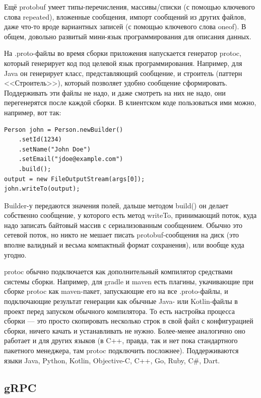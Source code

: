 \documentclass[a5paper]{article}
\begin{document}
Ещё protobuf умеет типы-перечисления, массивы/списки (с помощью ключевого слова repeated), вложенные сообщения, импорт сообщений из других файлов, даже что-то вроде вариантных записей (с помощью ключевого слова oneof). В общем, довольно развитый мини-язык программирования для описания данных.

На .proto-файлы во время сборки приложения напускается генератор protoc, который генерирует код под целевой язык программирования. Например, для Java он генерирует класс, представляющий сообщение, и строитель (паттерн <<Строитель>>), который позволяет удобно сообщение сформировать. Поддерживать эти файлы не надо, и даже смотреть на них не надо, они перегенерятся после каждой сборки. В клиентском коде пользоваться ими можно, например, вот так:

\begin{verbatim}
Person john = Person.newBuilder()
    .setId(1234)
    .setName("John Doe")
    .setEmail("jdoe@example.com")
    .build();
output = new FileOutputStream(args[0]);
john.writeTo(output);
\end{verbatim}

Builder-у передаются значения полей, дальше методом build() он делает собственно сообщение, у которого есть метод writeTo, принимающий поток, куда надо записать байтовый массив с сериализованным сообщением. Обычно это сетевой поток, но никто не мешает писать protobuf-сообщения на диск (это вполне валидный и весьма компактный формат сохранения), или вообще куда угодно.

protoc обычно подключается как дополнительный компилятор средствами системы сборки. Например, для gradle и maven есть плагины, укачивающие при сборке protoc как maven-пакет, запускающие его на все .proto-файлы, и подключающие результат генерации как обычные Java- или Kotlin-файлы в проект перед запуском обычного компилятора. То есть настройка процесса сборки --- это просто скопировать несколько строк в свой файл с конфигурацией сборки, ничего качать и устанавливать не нужно. Более-менее аналогично оно работает и для других языков (в C++, правда, так и нет пока стандартного пакетного менеджера, там protoc подключить посложнее). Поддерживаются языки Java, Python, Kotlin, Objective-C, C++, Go, Ruby, C\#, Dart.

\subsection{gRPC}
\end{document}
